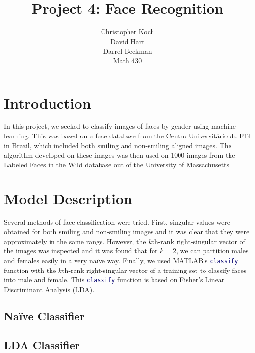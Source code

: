 \documentclass[hidelinks,11pt]{article}
\begin{document}
\title{Project 4: Face Recognition}
\author{Christopher Koch\\David Hart\\Darrel Beckman\\
Math 430}
\maketitle

\section{Introduction}

In this project, we seeked to classify images of faces by gender using machine
learning. This was based on a face database\cite{fei} from the Centro
Universitário da FEI in Brazil, which included both smiling and non-smiling
aligned images. The algorithm developed on these images was then used on 1000
images from the Labeled Faces in the Wild database out of the University of
Massachusetts\cite{lfw}. 

\section{Model Description}

Several methods of face classification were tried. First, singular values were
obtained for both smiling and non-smiling images and it was clear that they were
approximately in the same range. However, the $k$th-rank right-singular vector
of the images was inspected and it was found that for $k = 2$, we can partition
males and females easily in a very na\"ive way. Finally, we used MATLAB's
\lstinline[language=Matlab]{classify} function with the $k$th-rank
right-singular vector of a training set to classify faces into male and female.
This \lstinline[language=Matlab]{classify} function is based on Fisher's Linear
Discriminant Analysis (LDA).

\subsection{Na\"ive Classifier}


\subsection{LDA Classifier} 
\end{document}
